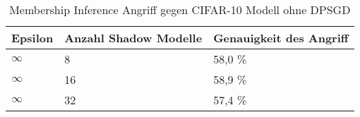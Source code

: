 \begin{table}[!htb]
\centering
\begin{tabular}{|l|l|l|}
\hline
\rowcolor[HTML]{CBCEFB} 
Epsilon & Anzahl Shadow Modelle & Genauigkeit des Angriff \\ \hline
$\infty$ & 8  & 58,0 \% \\ \hline
$\infty$ & 16 & 58,9 \% \\ \hline
$\infty$ & 32 & 57,4 \% \\ \hline
\end{tabular}
\caption{Membership Inference Angriff gegen CIFAR-10 Modell ohne DPSGD}
\label{tab:mi_cifar10_base}
\end{table}